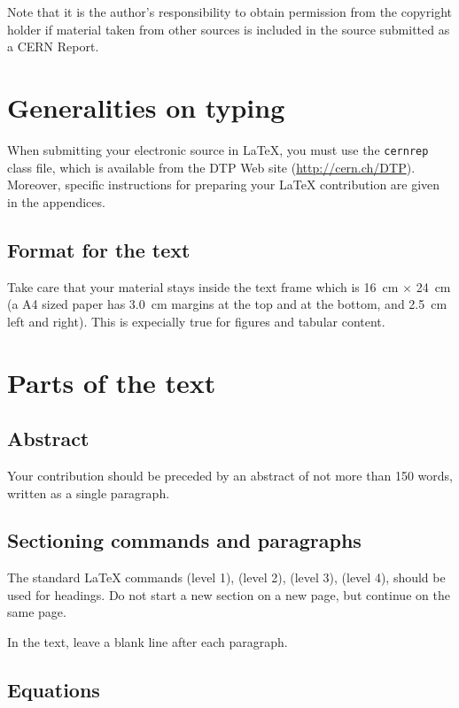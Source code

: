 \documentclass[12pt,twoside,a4paper]{cernrep}
\begin{document}
Note that it is the author's responsibility to obtain permission from
the copyright holder if material taken from other sources is included
in the source submitted as a CERN Report.

\section{Generalities on typing}

When submitting your electronic source in \LaTeX{}, you must use the
\texttt{cernrep} class file, which is available from the DTP Web site
(\url{http://cern.ch/DTP}). Moreover, specific instructions for preparing
your \LaTeX{} contribution are given in the appendices.

\subsection{Format for the text}
 
Take care that your material stays inside the text frame which is
16~cm $\times$ 24~cm (\ie a A4 sized paper has 3.0~cm margins at the
top and at the bottom, and 2.5~cm left and right). This is expecially
true for figures and tabular content.

\section{Parts of the text}

\subsection{Abstract}

Your contribution should be preceded by an abstract of not more than
150 words, written as a single paragraph.


\subsection{Sectioning commands and paragraphs}
\label{sec:sections}

The standard \LaTeX{} commands  (level 1),
 (level 2),  (level 3),
 (level 4), should be used for headings.  Do not
start a new section on a new page, but continue on the same page.

In the text, leave a blank line after each paragraph.

\subsection{Equations}
\label{sec:equations}
\end{document}
